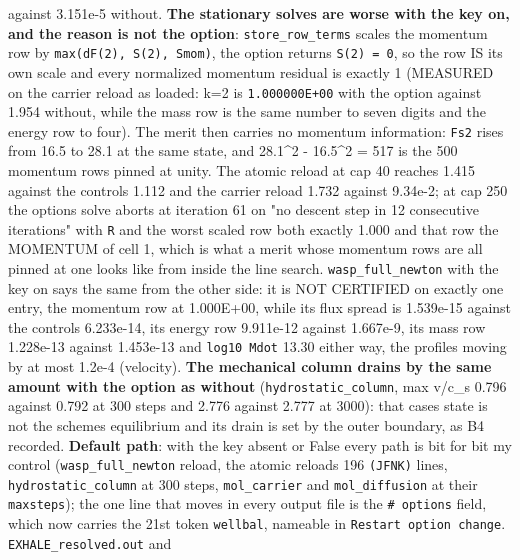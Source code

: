 \documentclass[english,a4paper]{my_memo}
\begin{document}
\begin{itemize}
  against 3.151e-5 without. \textbf{The stationary solves are worse with the key
  on, and the reason is not the option}: \texttt{store\_row\_terms} scales the
  momentum row by \texttt{max(\textbar{}dF(2)\textbar{},\ \textbar{}S(2)\textbar{},\ \textbar{}Smom\textbar{})}, the option returns
  \texttt{S(2)\ =\ 0}, so the row IS its own scale and every normalized momentum
  residual is exactly 1 (MEASURED on the carrier reload as loaded: k=2 is
  \texttt{1.000000E+00} with the option against 1.954 without, while the mass row is
  the same number to seven digits and the energy row to four). The merit
  then carries no momentum information: \texttt{\textbar{}\textbar{}Fs\textbar{}\textbar{}2} rises from 16.5 to 28.1
  at the same state, and 28.1\^{}2 - 16.5\^{}2 = 517 is the 500 momentum rows
  pinned at unity. The atomic reload at cap 40 reaches 1.415 against the
  control\textquotesingle s 1.112 and the carrier reload 1.732 against 9.34e-2; at cap 250
  the option\textquotesingle s solve aborts at iteration 61 on "no descent step in 12
  consecutive iterations" with \texttt{\textbar{}\textbar{}R\textbar{}\textbar{}} and the worst scaled row both exactly
  1.000 and that row the MOMENTUM of cell 1, which is what a merit whose
  momentum rows are all pinned at one looks like from inside the line
  search. \texttt{wasp\_full\_newton} with the key on says the same from the other
  side: it is NOT CERTIFIED on exactly one entry, the momentum row at
  1.000E+00, while its flux spread is 1.539e-15 against the control\textquotesingle s
  6.233e-14, its energy row 9.911e-12 against 1.667e-9, its mass row
  1.228e-13 against 1.453e-13 and \texttt{log10\ Mdot} 13.30 either way, the
  profiles moving by at most 1.2e-4 (velocity). \textbf{The
  mechanical column drains by the same amount with the option as without}
  (\texttt{hydrostatic\_column}, max \textbar v\textbar/c\_s 0.796 against 0.792 at 300 steps and
  2.776 against 2.777 at 3000): that case\textquotesingle s state is not the scheme\textquotesingle s
  equilibrium and its drain is set by the outer boundary, as B4 recorded.
  \textbf{Default path}: with the key absent or False every path is bit for bit
  my control (\texttt{wasp\_full\_newton} reload, the atomic reload\textquotesingle s 196 \texttt{(JFNK)}
  lines, \texttt{hydrostatic\_column} at 300 steps, \texttt{mol\_carrier} and
  \texttt{mol\_diffusion} at their \texttt{maxsteps}); the one line that moves in every
  output file is the \texttt{\#\ options} field, which now carries the 21st token
  \texttt{wellbal}, nameable in \texttt{Restart\ option\ change}. \texttt{EXHALE\_resolved.out} and

\end{itemize}
\end{document}
